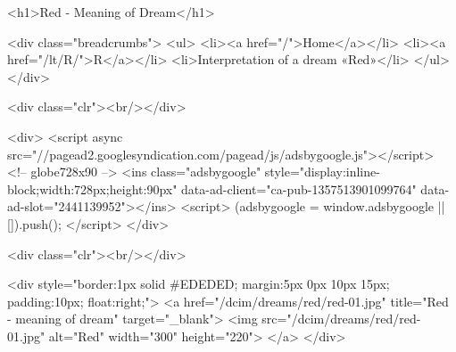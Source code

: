 		<h1>Red - Meaning of Dream</h1>

		<div class="breadcrumbs">
			<ul>
				<li><a href="/">Home</a></li>
				<li><a href="/lt/R/">R</a></li>
				<li>Interpretation of a dream «Red»</li>
			</ul>
		</div>

		<div class="clr"><br/></div>

		<div>
			<script async src="//pagead2.googlesyndication.com/pagead/js/adsbygoogle.js"></script>
			<!-- globe728x90 -->
			<ins class="adsbygoogle"
			     style="display:inline-block;width:728px;height:90px"
			     data-ad-client="ca-pub-1357513901099764"
			     data-ad-slot="2441139952"></ins>
			<script>
			(adsbygoogle = window.adsbygoogle || []).push({});
			</script>
		</div>

		<div class="clr"><br/></div>

				<div style="border:1px solid #EDEDED; margin:5px 0px 10px 15px; padding:10px; float:right;">
			<a href="/dcim/dreams/red/red-01.jpg" title="Red - meaning of dream" target="_blank">
				<img src="/dcim/dreams/red/red-01.jpg" alt="Red" width="300" height="220">
			</a>
		</div>
		
